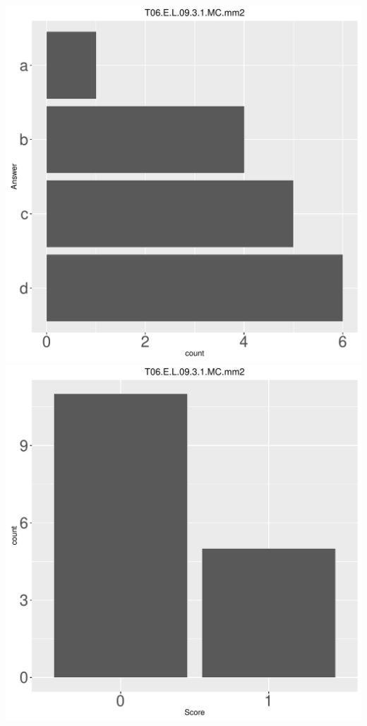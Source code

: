 \documentclass[12pt,english,nohyper]{tufte-handout}\usepackage[]{graphicx}\usepackage[]{color}
\begin{document}
\begin{center} \includegraphics[width=.45\linewidth]{Topic06_AB_40_answer} \includegraphics[width=.45\linewidth]{Topic06_AB_40_score} \end{center} 
\end{document}
